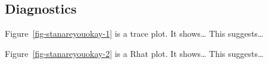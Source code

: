 \documentclass[
  letterpaper,
  DIV=11,
  numbers=noendperiod]{scrartcl}
\begin{document}
\subsection{Diagnostics}\label{diagnostics}

Figure~\ref{fig-stanareyouokay-1} is a trace plot. It shows\ldots{} This
suggests\ldots{}

Figure~\ref{fig-stanareyouokay-2} is a Rhat plot. It shows\ldots{} This
suggests\ldots{}

\begin{figure}

\begin{minipage}{0.50\linewidth}



\end{minipage}%
%
\begin{minipage}{0.50\linewidth}

\end{minipage}
\end{figure}
\end{document}
